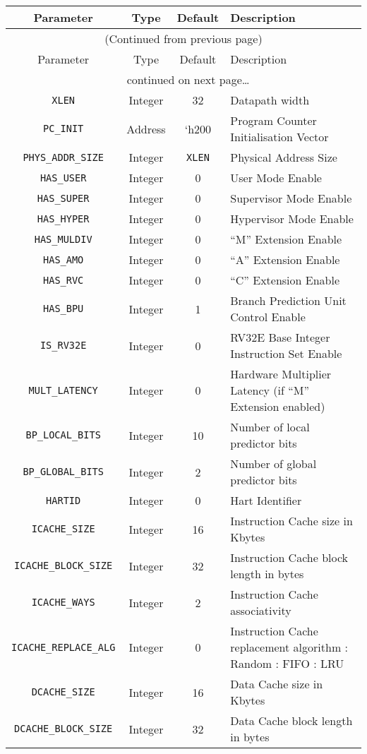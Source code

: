 \begin{longtable}[]{@{}cccp{7cm}@{}}
\toprule
Parameter & Type & Default & Description\tabularnewline
\midrule
\endfirsthead


\multicolumn{4}{c}{{(Continued from previous page)}} \\
\toprule
Parameter & Type & Default & Description\tabularnewline
\midrule
\endhead

\midrule \multicolumn{4}{c}{{\tablename\ \thetable{} continued on next page\ldots}} \\
\endfoot

\endlastfoot

\texttt{XLEN} & Integer & 32 & Datapath width\tabularnewline
\texttt{PC\_INIT} & Address & `h200 & Program Counter Initialisation
Vector\tabularnewline
\texttt{PHYS\_ADDR\_SIZE}     & Integer & \texttt{XLEN} & Physical Address Size\tabularnewline
\texttt{HAS\_USER}            & Integer & 0 & User Mode Enable\tabularnewline
\texttt{HAS\_SUPER}           & Integer & 0 & Supervisor Mode Enable\tabularnewline
\texttt{HAS\_HYPER}           & Integer & 0 & Hypervisor Mode Enable\tabularnewline
\texttt{HAS\_MULDIV}          & Integer & 0 & ``M'' Extension Enable\tabularnewline
\texttt{HAS\_AMO}             & Integer & 0 & ``A'' Extension Enable\tabularnewline
\texttt{HAS\_RVC}             & Integer & 0 & ``C'' Extension Enable\tabularnewline
\texttt{HAS\_BPU}             & Integer & 1 & Branch Prediction Unit Control Enable\tabularnewline
\texttt{IS\_RV32E}            & Integer & 0 & RV32E Base Integer Instruction Set Enable\tabularnewline
\texttt{MULT\_LATENCY}        & Integer & 0 & Hardware Multiplier Latency (if ``M'' Extension enabled)\tabularnewline
\texttt{BP\_LOCAL\_BITS}      & Integer & 10 & Number of local predictor bits\tabularnewline
\texttt{BP\_GLOBAL\_BITS}     & Integer & 2 & Number of global predictor bits\tabularnewline
\texttt{HARTID}               & Integer & 0 & Hart Identifier\tabularnewline
\texttt{ICACHE\_SIZE}         & Integer & 16 & Instruction Cache size in Kbytes\tabularnewline
\texttt{ICACHE\_BLOCK\_SIZE}  & Integer & 32 & Instruction Cache block length in bytes\tabularnewline
\texttt{ICACHE\_WAYS}         & Integer & 2 & Instruction Cache associativity\tabularnewline
\texttt{ICACHE\_REPLACE\_ALG} & Integer & 0 & Instruction Cache replacement algorithm
\newline0: Random
\newline1: FIFO
\newline2: LRU\tabularnewline
\texttt{DCACHE\_SIZE}         & Integer & 16 & Data Cache size in Kbytes\tabularnewline
\texttt{DCACHE\_BLOCK\_SIZE}  & Integer & 32 & Data Cache block length in bytes\tabularnewline

\end{longtable}
